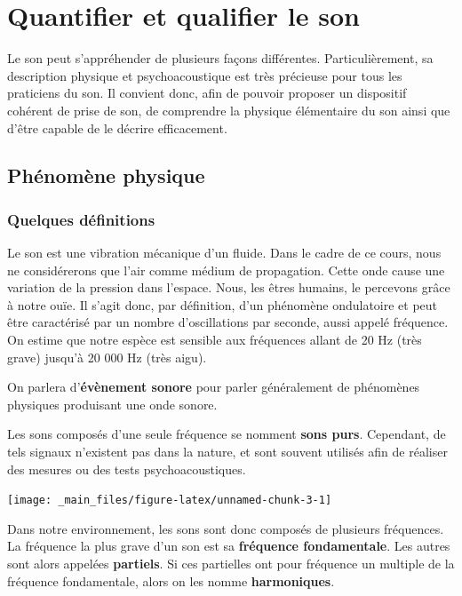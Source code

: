 \documentclass[
]{book}
\begin{document}
\hypertarget{quantifier-et-qualifier-le-son}{%
\chapter{Quantifier et qualifier le son}\label{quantifier-et-qualifier-le-son}}

Le son peut s'appréhender de plusieurs façons différentes. Particulièrement, sa description physique et psychoacoustique est très précieuse pour tous les praticiens du son. Il convient donc, afin de pouvoir proposer un dispositif cohérent de prise de son, de comprendre la physique élémentaire du son ainsi que d'être capable de le décrire efficacement.

\hypertarget{phuxe9nomuxe8ne-physique}{%
\section{Phénomène physique}\label{phuxe9nomuxe8ne-physique}}

\hypertarget{quelques-duxe9finitions}{%
\subsection{Quelques définitions}\label{quelques-duxe9finitions}}

Le son est une vibration mécanique d'un fluide. Dans le cadre de ce cours, nous ne considérerons que l'air comme médium de propagation. Cette onde cause une variation de la pression dans l'espace. Nous, les êtres humains, le percevons grâce à notre ouïe. Il s'agit donc, par définition, d'un phénomène ondulatoire et peut être caractérisé par un nombre d'oscillations par seconde, aussi appelé fréquence. On estime que notre espèce est sensible aux fréquences allant de 20 Hz (très grave) jusqu'à 20 000 Hz (très aigu).

On parlera d'\textbf{évènement sonore} pour parler généralement de phénomènes physiques produisant une onde sonore.

Les sons composés d'une seule fréquence se nomment \textbf{sons purs}. Cependant, de tels signaux n'existent pas dans la nature, et sont souvent utilisés afin de réaliser des mesures ou des tests psychoacoustiques.

\begin{center}\texttt{[image: \_main\_files/figure-latex/unnamed-chunk-3-1]} \end{center}

Dans notre environnement, les sons sont donc composés de plusieurs fréquences. La fréquence la plus grave d'un son est sa \textbf{fréquence fondamentale}. Les autres sont alors appelées \textbf{partiels}. Si ces partielles ont pour fréquence un multiple de la fréquence fondamentale, alors on les nomme \textbf{harmoniques}.
\end{document}
